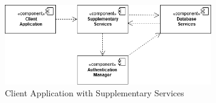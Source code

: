          \begin{figure}[H]
             \centering
          \includegraphics[width=0.8\textwidth]{Images/client_supp_services.png}
        \caption{Client Application with Supplementary Services}
    \end{figure}